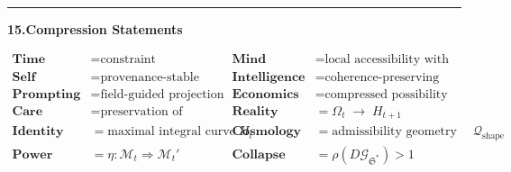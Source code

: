 \documentclass[10pt,a4paper]{article}
\theoremstyle{plain}
\theoremstyle{remark}
\newcommand{\M}{\mathcal{M}}
\newcommand{\KES}{\mathfrak{S}}
\begin{document}
\vspace{0.3em}
\noindent\rule{\linewidth}{0.4pt}
\vspace{0.1em}

{\centering\small\textbf{15.\enspace Compression Statements}\par}
\vspace{0.3em}

\begin{mdframed}[style=compbox]
\setlength{\abovedisplayskip}{2pt}
\setlength{\belowdisplayskip}{2pt}
\setlength{\abovedisplayshortskip}{1pt}
\setlength{\belowdisplayshortskip}{1pt}
\begin{align*}
\textbf{Time}        &= \text{constraint accumulation} \quad&
\textbf{Mind}        &= \text{local accessibility with provenance} \\
\textbf{Self}        &= \text{provenance-stable integral curve} \quad&
\textbf{Intelligence}&= \text{coherence-preserving expansion} \\
\textbf{Prompting}   &= \text{field-guided projection} \quad&
\textbf{Economics}   &= \text{compressed possibility valuation} \\
\textbf{Care}        &= \text{preservation of structural richness} \quad&
\textbf{Reality}     &= \Omega_t\;\longrightarrow\;H_{t+1} \\
\textbf{Identity}    &= \text{maximal integral curve through }H_t \quad&
\textbf{Cosmology}   &= \text{admissibility geometry on }\mathcal{Q}_{\mathrm{shape}} \\
\textbf{Power}       &= \eta:\M_t\Rightarrow\M_t' \quad&
\textbf{Collapse}    &= \rho(D\mathcal{G}_{\KES^*}) > 1
\end{align*}
\end{mdframed}

\vspace{0.5em}
\end{document}
